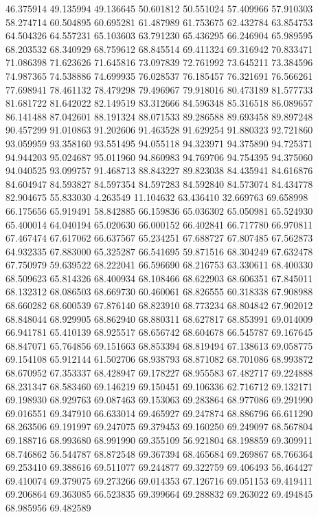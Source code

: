 46.375914
49.135994
49.136645
50.601812
50.551024
57.409966
57.910303
58.274714
60.504895
60.695281
61.487989
61.753675
62.432784
63.854753
64.504326
64.557231
65.103603
63.791230
65.436295
66.246904
65.989595
68.203532
68.340929
68.759612
68.845514
69.411324
69.316942
70.833471
71.086398
71.623626
71.645816
73.097839
72.761992
73.645211
73.384596
74.987365
74.538886
74.699935
76.028537
76.185457
76.321691
76.566261
77.698941
78.461132
78.479298
79.496967
79.918016
80.473189
81.577733
81.681722
81.642022
82.149519
83.312666
84.596348
85.316518
86.089657
86.141488
87.042601
88.191324
88.071533
89.286588
89.693458
89.897248
90.457299
91.010863
91.202606
91.463528
91.629254
91.880323
92.721860
93.059959
93.358160
93.551495
94.055118
94.323971
94.375890
94.725371
94.944203
95.024687
95.011960
94.860983
94.769706
94.754395
94.375060
94.040525
93.099757
91.468713
88.843227
89.823038
84.435941
84.616876
84.604947
84.593827
84.597354
84.597283
84.592840
84.573074
84.434778
82.904675
55.833030
4.263549
11.104632
63.436410
32.669763
69.658998
66.175656
65.919491
58.842885
66.159836
65.036302
65.050981
65.524930
65.400014
64.040194
65.020630
66.000152
66.402841
66.717780
66.970811
67.467474
67.617062
66.637567
65.234251
67.688727
67.807485
67.562873
64.932335
67.883000
65.325287
66.541695
59.871516
68.304249
67.632478
67.750979
59.639522
68.222041
66.596690
68.216753
63.330611
68.400330
68.509623
65.814326
68.400934
68.108466
68.622903
68.606351
67.845011
68.132312
68.086503
68.669730
60.460061
68.826555
60.318338
67.908988
68.660282
68.600539
67.876140
68.823910
68.773234
68.804842
67.902012
68.848044
68.929905
68.862940
68.880311
68.627817
68.853991
69.014009
66.941781
65.410139
68.925517
68.656742
68.604678
66.545787
69.167645
68.847071
65.764856
69.151663
68.853394
68.819494
67.138613
69.058775
69.154108
65.912144
61.502706
68.938793
68.871082
68.701086
68.993872
68.670952
67.353337
68.428947
69.178227
68.955583
67.482717
69.224888
68.231347
68.583460
69.146219
69.150451
69.106336
62.716712
69.132171
69.198930
68.929763
69.087463
69.153063
69.283864
68.977086
69.291990
69.016551
69.347910
66.633014
69.465927
69.247874
68.886796
66.611290
68.263506
69.191997
69.247075
69.379453
69.160250
69.249097
68.567804
69.188716
68.993680
68.991990
69.355109
56.921804
68.198859
69.309911
68.746862
56.544787
68.872548
69.367394
68.465684
69.269867
68.766364
69.253410
69.388616
69.511077
69.244877
69.322759
69.406493
56.464427
69.410074
69.379075
69.273266
69.014353
67.126716
69.051153
69.419411
69.206864
69.363085
66.523835
69.399664
69.288832
69.263022
69.494845
68.985956
69.482589
